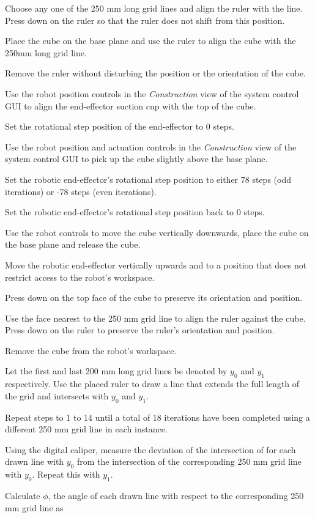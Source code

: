 \begin{compactenum}
	\item Choose any one of the 250 mm long grid lines and align the ruler with the line. Press down on the ruler so that the ruler does not shift from this position.
	\item Place the cube on the base plane and use the ruler to align the cube with the 250mm long grid line.
	\item Remove the ruler without disturbing the position or the orientation of the cube.
	\item Use the robot position controls in the \textit{Construction} view of the system control GUI to align the end-effector suction cup with the top of the cube.
	\item Set the rotational step position of the end-effector to 0 steps.
	\item Use the robot position and actuation controls in the \textit{Construction} view of the system control GUI to pick up the cube slightly above the base plane.
	\item Set the robotic end-effector's rotational step position to either 78 steps (odd iterations) or -78 steps (even iterations).
	\item Set the robotic end-effector's rotational step position back to 0 steps.
	\item Use the robot controls to move the cube vertically downwards, place the cube on the base plane and release the cube.
	\item Move the robotic end-effector vertically upwards and to a position that does not restrict access to the robot's workspace.
	\item Press down on the top face of the cube to preserve its orientation and position. 
	\item Use the face nearest to the 250 mm grid line to align the ruler against the cube. Press down on the ruler to preserve the ruler's orientation and position.
	\item Remove the cube from the robot's workspace.
	\item Let the first and last 200 mm long grid lines be denoted by $y_0$ and $y_1$ respectively. Use the placed ruler to draw a line that extends the full length of the grid and intersects with $y_0$ and $y_1$.
	\item Repeat steps to 1 to 14 until a total of 18 iterations have been completed using a different 250 mm grid line in each instance.
	\item Using the digital caliper, measure the deviation of the intersection of for each drawn line with $y_0$ from the intersection of the corresponding 250 mm grid line with $y_0$. Repeat this with $y_1$.
	\item Calculate $\phi$, the angle of each drawn line with respect to the corresponding 250 mm grid line as
	

\end{compactenum}
